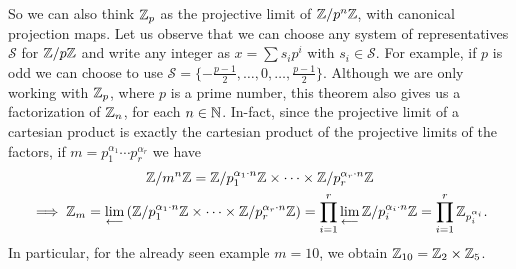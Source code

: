 		So we can also think $\mathbb{Z}_p$ as the projective limit of $\mathbb{Z}/p^n\mathbb{Z}$, with canonical projection maps. Let us observe that we can choose any system of representatives $\mathcal{S}$ for $\mathbb{Z}/p\mathbb{Z}$ and write any \padic integer as $x = \sum s_ip^i$ with $s_i \in \mathcal{S}$. For example, if $p$ is odd we can choose to use $\mathcal{S} = \{-\frac{p-1}{2}, \dots, 0, \dots, \frac{p-1}{2}\}$. Although we are only working with $\mathbb{Z}_p$, where $p$ is a prime number, this theorem also gives us a factorization of $\mathbb{Z}_n$, for each $n \in \mathbb{N}$. In-fact, since the projective limit of a cartesian product is exactly the cartesian product of the projective limits of the factors, if $m = p_1^{\alpha_1} \dotsm p_r^{\alpha_r}$ we have 
		\begin{gather*}
			\mathbb{Z}/m^n\mathbb{Z} = \mathbb{Z}/p_1^{\alpha_1\cdot n}\mathbb{Z} \times \dotsm \times \mathbb{Z}/p_r^{\alpha_r\cdot n}\mathbb{Z} \\
			\implies \mathbb{Z}_m = \lim_{\longleftarrow} \left( \mathbb{Z}/p_1^{\alpha_1\cdot n}\mathbb{Z} \times \dotsm \times \mathbb{Z}/p_r^{\alpha_r\cdot n}\mathbb{Z} \right) = \prod_{i = 1}^r \lim_{\longleftarrow} \mathbb{Z}/p_i^{\alpha_i\cdot n}\mathbb{Z} = \prod_{i=1}^r \mathbb{Z}_{p_i^{\alpha_i}}.
		\end{gather*}
		In particular, for the already seen example $m=10$, we obtain $\mathbb{Z}_{10} = \mathbb{Z}_2 \times \mathbb{Z}_5$.
		
